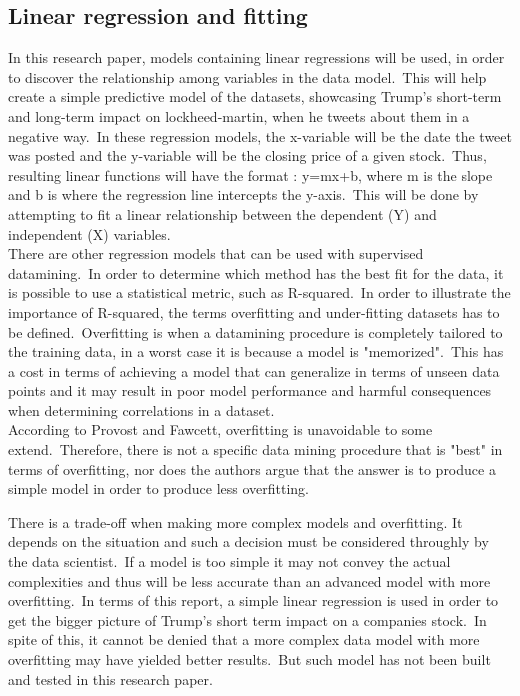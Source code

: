 \documentclass[12pt]{article}
\begin{document}
\subsection{Linear regression and fitting}
In this research paper, models containing linear regressions will be used, in order to discover the relationship among variables in the data model.\ This will help create a simple predictive model of the datasets, showcasing Trump's short-term and long-term impact on lockheed-martin, when he tweets about them in a negative way.\ In these regression models, the x-variable will be the date the tweet was posted and the y-variable will be the closing price of a given stock.\ Thus, resulting linear functions will have the format : y=mx+b, where m is the slope and b is where the regression line intercepts the y-axis.\ This will be done by attempting to fit a linear relationship between the dependent (Y) and independent (X) variables. \citep{foster} \\

There are other regression models that can be used with supervised datamining.\ In order to determine which method has the best fit for the data, it is possible to use a statistical metric, such as R-squared.\ In order to illustrate the importance of R-squared, the terms overfitting and under-fitting datasets has to be defined.\ Overfitting is when a datamining procedure is completely tailored to the training data, in a worst case it is because a model is "memorized".\ This has a cost in terms of achieving a model that can generalize in terms of unseen data points and it may result in poor model performance and harmful consequences when determining correlations in a dataset. \citep{foster}\\

According to Provost and Fawcett, overfitting is unavoidable to some extend.\ Therefore, there is not a specific data mining procedure that is "best" in terms of overfitting, nor does the authors argue that the answer is to produce a simple model in order to produce less overfitting.\ 

There is a trade-off when making more complex models and overfitting. It depends on the situation and such a decision must be considered throughly by the data scientist.\ If a model is too simple it may not convey the actual complexities and thus will be less accurate than an advanced model with more overfitting.\ In terms of this report, a simple linear regression is used in order to get the bigger picture of Trump's short term impact on a companies stock.\ In spite of this, it cannot be denied that a more complex data model with more overfitting may have yielded better results.\ But such model has not been built and tested in this research paper.\citep{foster} \\
\end{document}
